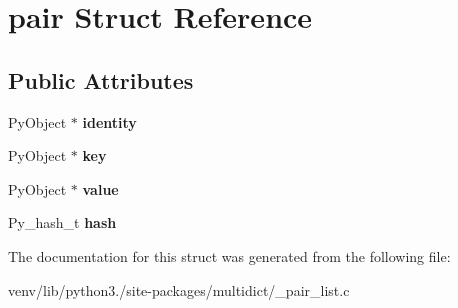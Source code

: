 \hypertarget{structpair}{}\section{pair Struct Reference}
\label{structpair}
\subsection*{Public Attributes}
\begin{DoxyCompactItemize}
\item 
\mbox{\label{structpair_ac22f78e44ea2016db323b793123a43cc}} 
Py\+Object $\ast$ {\bfseries identity}
\item 
\mbox{\label{structpair_aef8b5e73028cfabff57470043c347533}} 
Py\+Object $\ast$ {\bfseries key}
\item 
\mbox{\label{structpair_a3fc03120b150df5fac298f234c605ce3}} 
Py\+Object $\ast$ {\bfseries value}
\item 
\mbox{\label{structpair_a9bdd3c549f722fbcc631f04c2c87925f}} 
Py\+\_\+hash\+\_\+t {\bfseries hash}
\end{DoxyCompactItemize}


The documentation for this struct was generated from the following file\+:\begin{DoxyCompactItemize}
\item 
venv/lib/python3./site-\/packages/multidict/\+\_\+pair\+\_\+list.\+c\end{DoxyCompactItemize}
